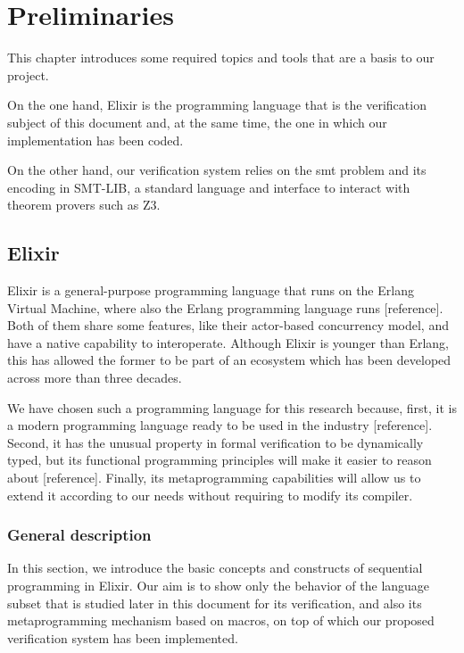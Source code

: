 \chapter{Preliminaries}
\label{cap:preliminaries}

This chapter introduces some required topics and tools that are a basis to
our project.

On the one hand, Elixir is the programming language that is the verification
subject of this document and, at the same time, the one in which our
implementation has been coded.

On the other hand, our verification system relies on the \gls{smt} problem and
its encoding in SMT-LIB, a standard language and interface to interact with
theorem provers such as Z3.

\section{Elixir}

Elixir is a general-purpose programming language that runs on the Erlang
Virtual Machine, where also the Erlang programming language runs [reference].
Both of them share some features, like their actor-based concurrency model,
and have a native capability to interoperate. Although Elixir is younger than
Erlang, this has allowed the former to be part of an ecosystem which has been
developed across more than three decades.

We have chosen such a programming language for this research because,
first, it is a modern programming language ready to be used in the
industry [reference]. Second, it has the unusual property in formal 
verification to be dynamically typed, but its functional programming principles
will make it easier to reason about [reference]. Finally, its metaprogramming
capabilities will allow us to extend it according to our needs without requiring
to modify its compiler.

\subsection{General description}

In this section, we introduce the basic concepts and constructs of sequential
programming in Elixir. Our aim is to show only the behavior of the language
subset that is studied later in this document for its verification, and also
its metaprogramming mechanism based on macros, on top of which our proposed
verification system has been implemented.

